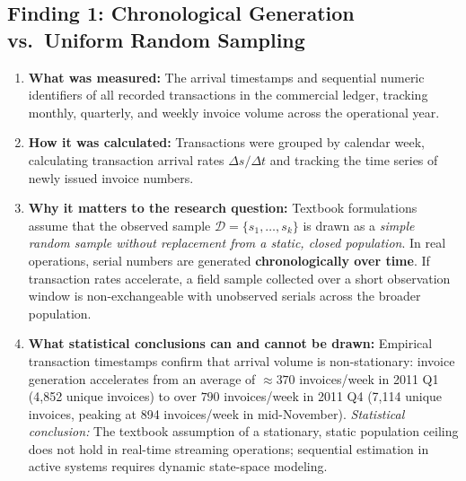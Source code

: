 \documentclass[10pt,a4paper]{article}
\begin{document}
\subsection{Finding 1: Chronological Generation vs.\ Uniform Random Sampling}
\begin{enumerate}
    \item \textbf{What was measured:} The arrival timestamps and sequential numeric identifiers of all recorded transactions in the commercial ledger, tracking monthly, quarterly, and weekly invoice volume across the operational year.
    \item \textbf{How it was calculated:} Transactions were grouped by calendar week, calculating transaction arrival rates $\Delta s / \Delta t$ and tracking the time series of newly issued invoice numbers.
    \item \textbf{Why it matters to the research question:} Textbook formulations assume that the observed sample $\mathcal{D} = \{s_1, \dots, s_k\}$ is drawn as a \textit{simple random sample without replacement from a static, closed population}. In real operations, serial numbers are generated \textbf{chronologically over time}. If transaction rates accelerate, a field sample collected over a short observation window is non-exchangeable with unobserved serials across the broader population.
    \item \textbf{What statistical conclusions can and cannot be drawn:} Empirical transaction timestamps confirm that arrival volume is non-stationary: invoice generation accelerates from an average of $\approx 370$ invoices/week in 2011 Q1 (4,852 unique invoices) to over $790$ invoices/week in 2011 Q4 (7,114 unique invoices, peaking at 894 invoices/week in mid-November). \textit{Statistical conclusion:} The textbook assumption of a stationary, static population ceiling does not hold in real-time streaming operations; sequential estimation in active systems requires dynamic state-space modeling.
\end{enumerate}
\end{document}
